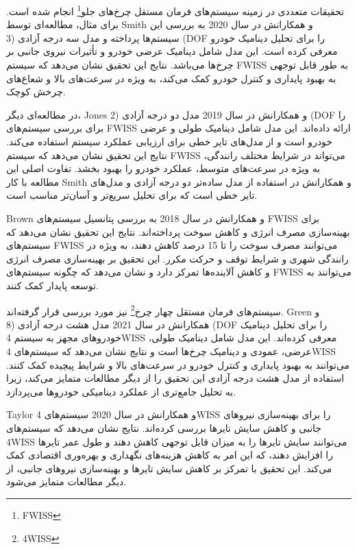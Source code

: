 \documentclass[a4paper,10pt]{article}
\begin{document}
        تحقیقات متعددی در زمینه سیستم‌های فرمان مستقل چرخ‌های جلو\footnote{\hspace{2pt}FWISS} انجام شده است. برای مثال، مطالعه‌ای توسط Smith و همکارانش در سال 2020 به بررسی این سیستم‌ها پرداخته و مدل سه درجه آزادی (3 (DOF را برای تحلیل دینامیک خودرو معرفی کرده است. این مدل شامل دینامیک عرضی خودرو و تأثیرات نیروی جانبی بر چرخ‌ها می‌باشد. نتایج این تحقیق نشان می‌دهد که سیستم FWISS به طور قابل توجهی به بهبود پایداری و کنترل خودرو کمک می‌کند، به ویژه در سرعت‌های بالا و شعاع‌های چرخش کوچک.

        در مطالعه‌ای دیگر، Jones و همکارانش در سال 2019 مدل دو درجه آزادی (2 (DOF را برای بررسی سیستم‌های FWISS ارائه داده‌اند. این مدل شامل دینامیک طولی و عرضی خودرو است و از مدل‌های تایر خطی برای ارزیابی عملکرد سیستم استفاده می‌کند. نتایج این تحقیق نشان می‌دهد که سیستم FWISS می‌تواند در شرایط مختلف رانندگی، به ویژه در سرعت‌های متوسط، عملکرد خودرو را بهبود بخشد. تفاوت اصلی این مطالعه با کار Smith و همکارانش در استفاده از مدل ساده‌تر دو درجه آزادی و مدل‌های تایر خطی است که برای تحلیل سریع‌تر و آسان‌تر مناسب است.

        Brown و همکارانش در سال 2018 به بررسی پتانسیل سیستم‌های FWISS برای بهینه‌سازی مصرف انرژی و کاهش سوخت پرداخته‌اند. نتایج این تحقیق نشان می‌دهد که سیستم‌های FWISS می‌توانند مصرف سوخت را تا 15 درصد کاهش دهند، به ویژه در رانندگی شهری و شرایط توقف و حرکت مکرر. این تحقیق بر بهینه‌سازی مصرف انرژی و کاهش آلاینده‌ها تمرکز دارد و نشان می‌دهد که چگونه سیستم‌های FWISS می‌توانند به توسعه پایدار کمک کنند.

        سیستم‌های فرمان مستقل چهار چرخ\footnote{\hspace{2pt}4WISS} نیز مورد بررسی قرار گرفته‌اند. Green و همکارانش در سال 2021 مدل هشت درجه آزادی (8 (DOF را برای تحلیل دینامیک خودروهای مجهز به سیستم 4WISS معرفی کرده‌اند. این مدل شامل دینامیک طولی، عرضی، عمودی و دینامیک چرخ‌ها است و نتایج نشان می‌دهد که سیستم‌های 4WISS می‌توانند به بهبود پایداری و کنترل خودرو در سرعت‌های بالا و شرایط پیچیده کمک کنند. استفاده از مدل هشت درجه آزادی این تحقیق را از دیگر مطالعات متمایز می‌کند، زیرا به تحلیل جامع‌تری از عملکرد دینامیکی خودروها می‌پردازد.

        Taylor و همکارانش در سال 2020 سیستم‌های 4WISS را برای بهینه‌سازی نیروهای جانبی و کاهش سایش تایرها بررسی کرده‌اند. نتایج نشان می‌دهد که سیستم‌های 4WISS می‌توانند سایش تایرها را به میزان قابل توجهی کاهش دهند و طول عمر تایرها را افزایش دهند، که این امر به کاهش هزینه‌های نگهداری و بهره‌وری اقتصادی کمک می‌کند. این تحقیق با تمرکز بر کاهش سایش تایرها و بهینه‌سازی نیروهای جانبی، از دیگر مطالعات متمایز می‌شود.
\end{document}
